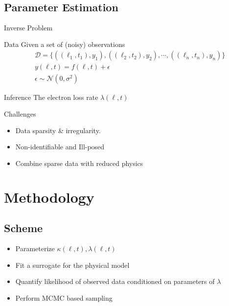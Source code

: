 \documentclass{beamer}
\begin{document}
\subsection{Parameter Estimation}

\begin{frame}{Inverse Problem}
  \begin{block}{Data}
    Given a set of (noisy) observations
    \begin{align*}
      & \mathcal{D} = \{ ((\ell_1, t_1), y_1), ((\ell_2, t_2), y_2),
                    \cdots, ((\ell_n, t_n), y_n) \} \\
      & y(\ell, t) = f(\ell, t) + \epsilon \\
      & \epsilon \sim \mathcal{N}(0, \sigma^2)
    \end{align*}
  \end{block}
  
  \begin{block}{Inference}
    The electron loss rate $\lambda(\ell, t)$
  \end{block}
\end{frame}

\begin{frame}{Challenges}
  \begin{itemize}
  \item<1->{
      Data sparsity \& irregularity.
    }
  \item<2->{Non-identifiable and Ill-posed}
  \item<3->{Combine sparse data with reduced physics}
  \end{itemize}
\end{frame}


\section{Methodology}

\subsection{Scheme}
\begin{frame}
  \begin{itemize}
  \item<1->{
      Parameterize $\kappa(\ell, t), \lambda(\ell, t)$
    }
  \item<2->{Fit a surrogate for the physical model}
  \item<3->{Quantify likelihood of observed data conditioned on
      parameters of $\lambda$}
  \item<4->{Perform MCMC based sampling}
  \end{itemize}
\end{frame}
\end{document}

